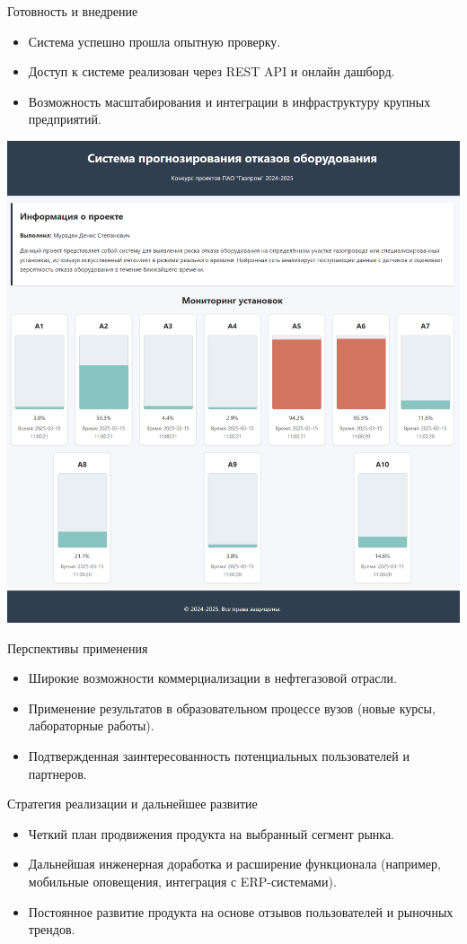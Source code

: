\documentclass[aspectratio=169]{beamer}
\begin{document}
\begin{frame}{Готовность и внедрение}
  \begin{itemize}
    \item Система успешно прошла опытную проверку.
    \item Доступ к системе реализован через REST API и онлайн дашборд.
    \item Возможность масштабирования и интеграции в инфраструктуру крупных предприятий.
  \end{itemize}
  \vspace{0.3cm}
  \centering
  \includegraphics[width=0.5\linewidth]{../../Include/dashboard.png}
\end{frame}

\begin{frame}{Перспективы применения}
  \begin{itemize}
    \item Широкие возможности коммерциализации в нефтегазовой отрасли.
    \item Применение результатов в образовательном процессе вузов (новые курсы, лабораторные работы).
    \item Подтвержденная заинтересованность потенциальных пользователей и партнеров.
  \end{itemize}
\end{frame}

\begin{frame}{Стратегия реализации и дальнейшее развитие}
  \begin{itemize}
    \item Четкий план продвижения продукта на выбранный сегмент рынка.
    \item Дальнейшая инженерная доработка и расширение функционала (например, мобильные оповещения, интеграция с ERP-системами).
    \item Постоянное развитие продукта на основе отзывов пользователей и рыночных трендов.
  \end{itemize}
\end{frame}
\end{document}
